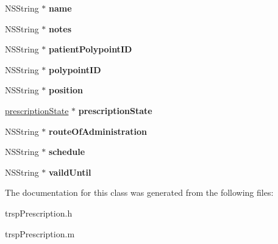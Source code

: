 \begin{DoxyCompactItemize}
\item 
\hypertarget{interfacetrsp_prescription_a771807d78f6cbd6df7bba7d01058f6ca}{}N\+S\+String $\ast$ {\bfseries name}\label{interfacetrsp_prescription_a771807d78f6cbd6df7bba7d01058f6ca}

\item 
\hypertarget{interfacetrsp_prescription_a9eca0d200d6bc1569bc551f382b730e2}{}N\+S\+String $\ast$ {\bfseries notes}\label{interfacetrsp_prescription_a9eca0d200d6bc1569bc551f382b730e2}

\item 
\hypertarget{interfacetrsp_prescription_a13f4b27fb2e2eb986ca368df89a2cd4c}{}N\+S\+String $\ast$ {\bfseries patient\+Polypoint\+I\+D}\label{interfacetrsp_prescription_a13f4b27fb2e2eb986ca368df89a2cd4c}

\item 
\hypertarget{interfacetrsp_prescription_a98c53b6cddd77201c2e06c15bfe735e8}{}N\+S\+String $\ast$ {\bfseries polypoint\+I\+D}\label{interfacetrsp_prescription_a98c53b6cddd77201c2e06c15bfe735e8}

\item 
\hypertarget{interfacetrsp_prescription_a03c0a4145fa9d8be92f7bdde08275cd6}{}N\+S\+String $\ast$ {\bfseries position}\label{interfacetrsp_prescription_a03c0a4145fa9d8be92f7bdde08275cd6}

\item 
\hypertarget{interfacetrsp_prescription_acb819d73823dccbeb54da75b2776a9a2}{}\hyperlink{interfaceprescription_state}{prescription\+State} $\ast$ {\bfseries prescription\+State}\label{interfacetrsp_prescription_acb819d73823dccbeb54da75b2776a9a2}

\item 
\hypertarget{interfacetrsp_prescription_a431bd43668aa337234293db8eb2d0692}{}N\+S\+String $\ast$ {\bfseries route\+Of\+Administration}\label{interfacetrsp_prescription_a431bd43668aa337234293db8eb2d0692}

\item 
\hypertarget{interfacetrsp_prescription_a510c1e679ae83a046d088efd0752407a}{}N\+S\+String $\ast$ {\bfseries schedule}\label{interfacetrsp_prescription_a510c1e679ae83a046d088efd0752407a}

\item 
\hypertarget{interfacetrsp_prescription_a30d10f7b7bb8a9c137b5e05735c44d8e}{}N\+S\+String $\ast$ {\bfseries vaild\+Until}\label{interfacetrsp_prescription_a30d10f7b7bb8a9c137b5e05735c44d8e}

\end{DoxyCompactItemize}


The documentation for this class was generated from the following files\+:\begin{DoxyCompactItemize}
\item 
trsp\+Prescription.\+h\item 
trsp\+Prescription.\+m\end{DoxyCompactItemize}
